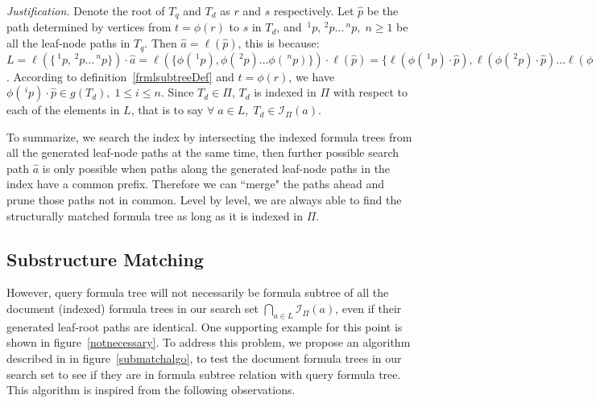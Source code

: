 \textit{Justification.}
Denote the root of $T_q$ and $T_d$ as $r$ and $s$ respectively.
Let $\hat{p}$ be the path determined by vertices from $t=\phi(r)$ to $s$ in $T_d$,
and $\,^1p, \,^2p \ldots \,^np,\; n \ge 1$ be all the leaf-node paths in $T_q$.
Then $\hat{a} = \ell(\hat{p})$, this is because:
$L = \ell(\{ \,^1p, \,^2p \ldots \,^np \}) \cdot \hat{a} = 
\ell(\{ \phi(\,^1p), \phi(\,^2p) \ldots \phi(\,^np) \}) \cdot \ell(\hat{p}) =
\{ \ell(\phi(\,^1p) \cdot \hat{p}), \ell(\phi(\,^2p) \cdot \hat{p}) \ldots \ell(\phi(\,^np) \cdot \hat{p}) \}
$.
According to definition~\ref{frmlsubtreeDef} and $t=\phi(r)$, we have $\phi(\,^ip) \cdot \hat{p} \in g(T_d),\; 1 \le i \le n$.
Since $ T_d \in \Pi$, $T_d$ is indexed in $\Pi$ with respect to each of the elements in $L$, that is to say $\forall\; a \in L, \; T_d \in \mathcal{I}_{\Pi}(a)$.

To summarize, we search the index by intersecting the indexed formula trees from all the generated leaf-node paths at the same time, then further possible search path $\hat{a}$ is only possible when paths along the generated leaf-node paths in the index have a common prefix.
Therefore we can ``merge" the paths ahead and prune those paths not in common. Level by level, we are always able to find the structurally matched formula tree as long as it is indexed in $\Pi$.

\subsection{Substructure Matching}
\label{observationlabel}
However, query formula tree will not necessarily be formula subtree of all the document (indexed) formula trees in our search set
$\bigcap_{a \in L} \mathcal{I}_{\Pi}(a)$,
even if their generated leaf-root paths are identical.
One supporting example for this point is shown in figure~\ref{notnecessary}.
To address this problem, we propose an algorithm described in in figure~\ref{submatchalgo}, to test the document formula trees in our search set to see if they are in formula subtree relation with query formula tree.
This algorithm is inspired from the following observations. 


